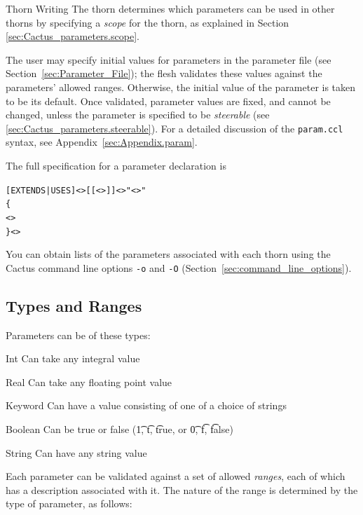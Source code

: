 \begin{cactuspart}{Thorn Writing}
The thorn determines which parameters can be used in other thorns by
specifying a \textit{scope} for the thorn, as explained in Section
\ref{sec:Cactus_parameters.scope}.

The user may specify initial values for parameters in the parameter file
(see Section~\ref{sec:Parameter_File}); the flesh validates these values
against the parameters' allowed ranges.
Otherwise, the initial value of the parameter is taken to be its default.
Once validated, parameter values are fixed, and cannot be changed,
unless the parameter is specified to be \textit{steerable}
(see \ref{sec:Cactus_parameters.steerable}).
For a detailed discussion of the \texttt{param.ccl} syntax, see
Appendix~\ref{sec:Appendix.param}.

The full specification for a parameter declaration is
\begin{alltt}
[EXTENDS|USES] <>[[<>]] <> "<>"
\{
  <>
\} <>
\end{alltt}

You can obtain lists of the parameters associated with
each thorn using the Cactus command line options \texttt{-o} and \texttt{-O}
(Section~\ref{sec:command_line_options}).



\subsection{Types and Ranges}
\label{sec:Parameters.Types_and_Ranges}

Parameters can be of these types:

\begin{Lentry}
\item[Int]  Can take any integral value
\item[Real] Can take any floating point value
\item[Keyword] Can have a value consisting of one of a choice of strings
\item[Boolean] Can be true or false ({\t 1}, {\t t}, {\t true}, or
{\t 0}, {\t f}, {\t false})
\item[String] Can have any string value
\end{Lentry}

Each parameter can be validated against a set of allowed
\textit{ranges}, each of which has a description associated with it.
The nature
of the range is determined by the type of parameter, as follows:


\end{cactuspart}
